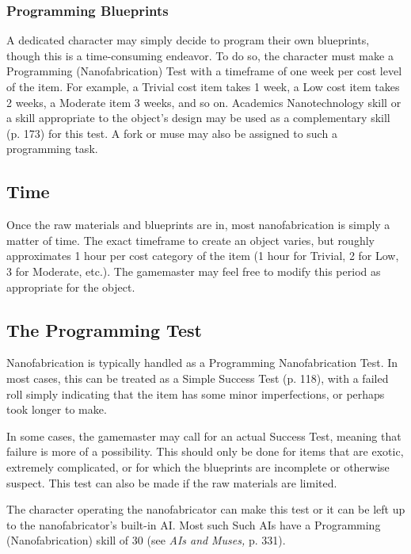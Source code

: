 \subsubsection{Programming Blueprints} 

A dedicated character may simply decide to program their own blueprints, though this is a time-consuming endeavor. To do so, the character must make a Programming (Nanofabrication) Test with a timeframe of one week per cost level of the item. For example, a Trivial cost item takes 1 week, a Low cost item takes 2 weeks, a Moderate item 3 weeks, and so on. Academics Nanotechnology skill or a skill appropriate to the object's design may be used as a complementary skill (p. 173) for this test. A fork or muse may also be assigned to such a programming task. 



\subsection{Time} 

Once the raw materials and blueprints are in, most nanofabrication is simply a matter of time. The exact timeframe to create an object varies, but roughly approximates 1 hour per cost category of the item (1 hour for Trivial, 2 for Low, 3 for Moderate, etc.). The gamemaster may feel free to modify this period as appropriate for the object. 

\subsection{The Programming Test} 

Nanofabrication is typically handled as a Programming Nanofabrication Test. In most cases, this can be treated as a Simple Success Test (p. 118), with a failed roll simply indicating that the item has some minor imperfections, or perhaps took longer to make. 

In some cases, the gamemaster may call for an actual Success Test, meaning that failure is more of a possibility. This should only be done for items that are exotic, extremely complicated, or for which the blueprints are incomplete or otherwise suspect. This test can also be made if the raw materials are limited. 

The character operating the nanofabricator can make this test or it can be left up to the nanofabricator's built-in AI. Most such Such AIs have a Programming (Nanofabrication) skill of 30 (see \textit{AIs and } \textit{Muses,} p. 331). 

